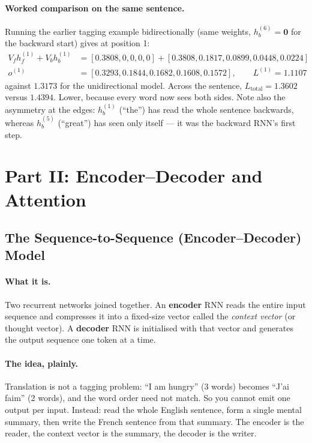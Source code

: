 \documentclass[11pt,a4paper]{article}
\begin{document}
\paragraph{Worked comparison on the same sentence.} Running the earlier tagging example
bidirectionally (same weights, $h_b^{(6)} = \mathbf{0}$ for the backward start) gives at
position 1:
\begin{align*}
V_f h_f^{(1)} + V_b h_b^{(1)} &= [0.3808,0,0,0,0] + [0.3808, 0.1817, 0.0899, 0.0448, 0.0224] \\
o^{(1)} &= [0.3293, 0.1844, 0.1682, 0.1608, 0.1572], \qquad L^{(1)} = 1.1107
\end{align*}
against $1.3173$ for the unidirectional model. Across the sentence,
$L_{\text{total}} = 1.3602$ versus $1.4394$. Lower, because every word now sees both sides.
Note also the asymmetry at the edges: $h_b^{(1)}$ (``the'') has read the whole sentence
backwards, whereas $h_b^{(5)}$ (``great'') has seen only itself --- it was the backward RNN's
first step.

\section{Part II: Encoder--Decoder and Attention}

\subsection{The Sequence-to-Sequence (Encoder--Decoder) Model}

\paragraph{What it is.} Two recurrent networks joined together. An \textbf{encoder} RNN
reads the entire input sequence and compresses it into a fixed-size vector called the
\emph{context vector} (or thought vector). A \textbf{decoder} RNN is initialised with that
vector and generates the output sequence one token at a time.

\paragraph{The idea, plainly.} Translation is not a tagging problem: ``I am hungry'' (3
words) becomes ``J'ai faim'' (2 words), and the word order need not match. So you cannot
emit one output per input. Instead: read the whole English sentence, form a single mental
summary, then write the French sentence from that summary. The encoder is the reader, the
context vector is the summary, the decoder is the writer.
\end{document}
